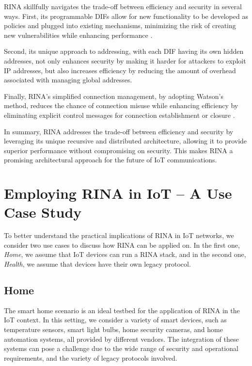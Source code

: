 \documentclass{ieeeaccess}
\begin{document}
RINA skillfully navigates the trade-off between efficiency and security in several ways. First, its programmable DIFs allow for new functionality to be developed as policies and plugged into existing mechanisms, minimizing the risk of creating new vulnerabilities while enhancing performance \cite{small2012}.

Second, its unique approach to addressing, with each DIF having its own hidden addresses, not only enhances security by making it harder for attackers to exploit IP addresses, but also increases efficiency by reducing the amount of overhead associated with managing global addresses.

Finally, RINA's simplified connection management, by adopting Watson's method, reduces the chance of connection misuse while enhancing efficiency by eliminating explicit control messages for connection establishment or closure \cite{boddapati2012assessing}.

In summary, RINA addresses the trade-off between efficiency and security by leveraging its unique recursive and distributed architecture, allowing it to provide superior performance without compromising on security. This makes RINA a promising architectural approach for the future of IoT communications.

\section{Employing RINA in IoT -- A Use Case Study}
\label{sec:usecases}

To better understand the practical implications of RINA in IoT networks, we consider two use cases to discuss how RINA can be applied on. In the first one, \textit{Home}, we assume that IoT devices can run a RINA stack, and in the second one, \textit{Health}, we assume that devices have their own legacy protocol.

\subsection{Home}

The smart home scenario is an ideal testbed for the application of RINA in the IoT context. In this setting, we consider a variety of smart devices, such as temperature sensors, smart light bulbs, home security cameras, and home automation systems, all provided by different vendors. The integration of these systems can pose a challenge due to the wide range of security and operational requirements, and the variety of legacy protocols involved.
\end{document}
